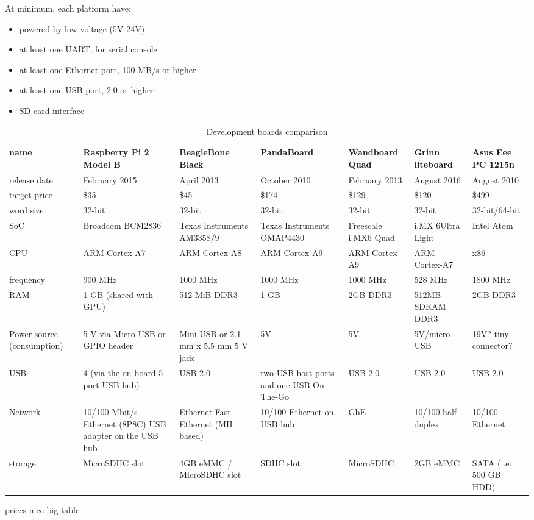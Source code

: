 \documentclass[printmode]{mgr}
\begin{document}
At minimum, each platform have:
\begin{itemize}
  \item powered by low voltage (5V-24V)
  \item at least one UART, for serial console
  \item at least one Ethernet port, 100 MB/s or higher
  \item at least one USB port, 2.0 or higher
  \item SD card interface
\end{itemize}

\renewcommand{\arraystretch}{2}
\begin{table}
  \begin{tabular}{| p{2cm} | p{2cm} | p{2cm} | p{2cm} | p{2cm} | p{2cm} | p{2cm} |}
    \hline
    name & Raspberry Pi 2 Model B & BeagleBone Black & PandaBoard & Wandboard Quad & Grinn liteboard & Asus Eee PC 1215n \\
    \hline
    release date & February 2015 & April 2013 & October 2010 & February 2013 & August 2016 & August 2010\\
    \hline
    target price & \$35 & \$45 & \$174 & \$129 & \$120 & \$499\\
    \hline
    word size & 32-bit & 32-bit & 32-bit & 32-bit & 32-bit & 32-bit/64-bit \\
    \hline
    SoC & Broadcom BCM2836 & Texas Instruments AM3358/9 & Texas Instruments OMAP4430 & Freescale i.MX6 Quad & i.MX 6Ultra Light & Intel Atom\\
    \hline
    CPU & ARM Cortex-A7 & ARM Cortex-A8 & ARM Cortex-A9 & ARM Cortex-A9 & ARM Cortex-A7 & x86\\
    \hline
    frequency & 900 MHz & 1000 MHz & 1000 MHz & 1000 MHz & 528 MHz & 1800 MHz\\
    \hline
    RAM & 1 GB (shared with GPU) & 512 MiB DDR3 & 1 GB & 2GB DDR3 & 512MB SDRAM DDR3  & 2GB DDR3\\
    \hline
    Power source (consumption) & 5 V via Micro USB or GPIO header & Mini USB or 2.1 mm x 5.5 mm 5 V jack & 5V & 5V & 5V/micro USB & 19V? tiny connector?\\
    \hline
    USB & 4 (via the on-board 5-port USB hub) & USB 2.0 & two USB host ports and one USB On-The-Go & USB 2.0 & USB 2.0 & USB 2.0\\
    \hline
    Network & 10/100 Mbit/s Ethernet (8P8C) USB adapter on the USB hub & Ethernet Fast Ethernet (MII based) & 10/100 Ethernet on USB hub & GbE & 10/100 half duplex & 10/100 Ethernet\\
    \hline
    storage & MicroSDHC slot & 4GB eMMC / MicroSDHC slot & SDHC slot & MicroSDHC & 2GB
    eMMC & SATA (i.e. 500 GB HDD)\\
    \hline
  \end{tabular}
  \caption{Development boards comparison}
\end{table}
prices
nice big table
\end{document}

